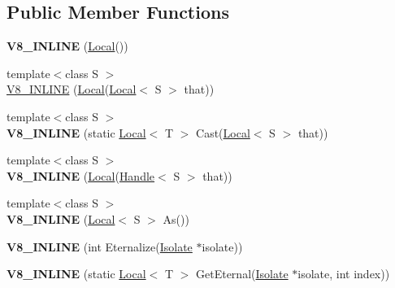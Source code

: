 \subsection*{Public Member Functions}
\begin{DoxyCompactItemize}
\item 
\hypertarget{classv8_1_1_local_acd71c6a66f5114d76b3a3c02a16547c1}{}{\bfseries V8\+\_\+\+I\+N\+L\+I\+N\+E} (\hyperlink{classv8_1_1_local}{Local}())\label{classv8_1_1_local_acd71c6a66f5114d76b3a3c02a16547c1}

\item 
{\footnotesize template$<$class S $>$ }\\\hyperlink{classv8_1_1_local_a5f4598866402a6a896e2bf5863a3ab4c}{V8\+\_\+\+I\+N\+L\+I\+N\+E} (\hyperlink{classv8_1_1_local}{Local}(\hyperlink{classv8_1_1_local}{Local}$<$ S $>$ that))
\item 
\hypertarget{classv8_1_1_local_a3ddee57e5675b4b1404f26427d23dcd0}{}{\footnotesize template$<$class S $>$ }\\{\bfseries V8\+\_\+\+I\+N\+L\+I\+N\+E} (static \hyperlink{classv8_1_1_local}{Local}$<$ T $>$ Cast(\hyperlink{classv8_1_1_local}{Local}$<$ S $>$ that))\label{classv8_1_1_local_a3ddee57e5675b4b1404f26427d23dcd0}

\item 
\hypertarget{classv8_1_1_local_a486ff680a63de804f8d82768e7bb0790}{}{\footnotesize template$<$class S $>$ }\\{\bfseries V8\+\_\+\+I\+N\+L\+I\+N\+E} (\hyperlink{classv8_1_1_local}{Local}(\hyperlink{classv8_1_1_handle}{Handle}$<$ S $>$ that))\label{classv8_1_1_local_a486ff680a63de804f8d82768e7bb0790}

\item 
\hypertarget{classv8_1_1_local_a08ed8f55acad5cd41566be97cae027d9}{}{\footnotesize template$<$class S $>$ }\\{\bfseries V8\+\_\+\+I\+N\+L\+I\+N\+E} (\hyperlink{classv8_1_1_local}{Local}$<$ S $>$ As())\label{classv8_1_1_local_a08ed8f55acad5cd41566be97cae027d9}

\item 
\hypertarget{classv8_1_1_local_aea57a9443baba6bbb56ac067631c7870}{}{\bfseries V8\+\_\+\+I\+N\+L\+I\+N\+E} (int Eternalize(\hyperlink{classv8_1_1_isolate}{Isolate} $\ast$isolate))\label{classv8_1_1_local_aea57a9443baba6bbb56ac067631c7870}

\item 
\hypertarget{classv8_1_1_local_a2925c73253ed8dfe91056915166e8442}{}{\bfseries V8\+\_\+\+I\+N\+L\+I\+N\+E} (static \hyperlink{classv8_1_1_local}{Local}$<$ T $>$ Get\+Eternal(\hyperlink{classv8_1_1_isolate}{Isolate} $\ast$isolate, int index))\label{classv8_1_1_local_a2925c73253ed8dfe91056915166e8442}


\end{DoxyCompactItemize}
